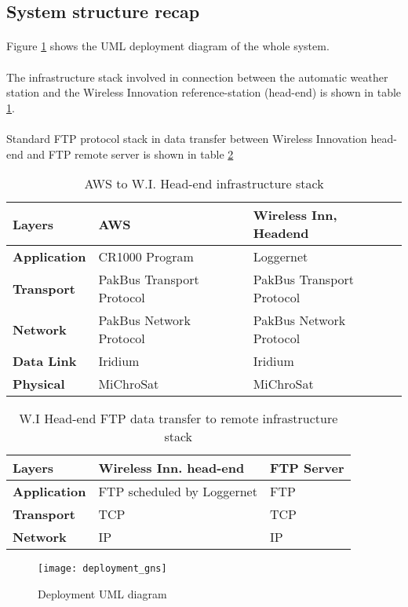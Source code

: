 \subsection{System structure recap}
\paragraph{}
Figure \ref{fig:depdiag} shows the UML deployment diagram of the whole system.
\paragraph{}
The infrastructure stack involved in connection between the automatic weather station and the Wireless Innovation reference-station (head-end) is shown in table \ref{stack1}. 
\paragraph{}
Standard FTP protocol stack in data transfer between Wireless Innovation head-end and FTP remote server is shown in table \ref{stack2}
\begin{table}[]
\centering
\begin{tabular}{|l|l|l|}
\hline
Layers            & \textbf{AWS}              & \textbf{Wireless Inn, Headend} \\ \hline
\textbf{Application} & CR1000 Program            & Loggernet                      \\ \hline
\textbf{Transport}   & PakBus Transport Protocol & PakBus Transport Protocol      \\ \hline
\textbf{Network}     & PakBus Network Protocol   & PakBus Network Protocol        \\ \hline
\textbf{Data Link}   & Iridium                   & Iridium                        \\ \hline
\textbf{Physical}    & MiChroSat                 & MiChroSat                      \\ \hline
\end{tabular}
\caption{AWS to W.I. Head-end infrastructure stack}
\label{stack1}
\end{table}

\begin{table}[]
\centering
\begin{tabular}{|l|l|l|}
\hline
Layers           & \textbf{Wireless Inn. head-end} & \textbf{FTP Server} \\ \hline
\textbf{Application} & FTP scheduled by Loggernet     & FTP                 \\ \hline
\textbf{Transport}   & TCP                            & TCP                 \\ \hline
\textbf{Network}     & IP                             & IP                  \\ \hline
\end{tabular}
\caption{W.I Head-end FTP data transfer to remote infrastructure stack}
\label{stack2}
\end{table}

\begin{figure}
	\centering
	\texttt{[image: deployment\_gns]}
	\caption{Deployment UML diagram}
	\label{fig:depdiag}
\end{figure}
